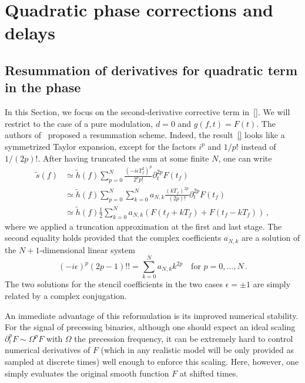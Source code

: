 \documentclass[aps,showpacs,%
prd,superscriptaddress,nofootinbib]{revtex4}
\newcommand{\be}{\begin{equation}}
\newcommand{\ee}{\end{equation}}
\newcommand{\nn}{\nonumber}
\newcommand{\tf}{t_{f}}
\newcommand{\Tf}{T_{f}}
\begin{document}

\section{Quadratic phase corrections and delays}
\label{sec:quadphasedelay}


\subsection{Resummation of derivatives for quadratic term in the phase}
\label{subsec:resumquadphase}

In this Section, we focus on the second-derivative corrective term in~\eqref{}. We will restrict to the case of a pure modulation, $d=0$ and $g(f,t) = F(t)$. The authors of~\cite{Klein+14} proposed a resummation scheme. Indeed, the result~\eqref{} looks like a symmetrized Taylor expansion, except for the factors $i^{p}$ and $1/p!$ instead of $1/(2p)!$. After having truncated the sum at some finite $N$, one can write
%
\begin{align}\label{eq:resumquadphase}
	\tilde{s}(f) &\simeq \tilde{h}(f) \sum\limits_{p = 0}^{N} \frac{(-i\epsilon\Tf^{2})^{p}}{2^{p}p!} \partial_{t}^{2p}F(\tf) \nn\\
	&\simeq \tilde{h}(f) \sum\limits_{p= 0}^{N} \sum\limits_{k=0}^{N} a_{N,k}\frac{(k\Tf)^{2p}}{(2p)!}  \partial_{t}^{2p}F(\tf) \nn\\
	&\simeq \tilde{h}(f) \frac{1}{2}\sum\limits_{k=0}^{N} a_{N,k} \left( F(\tf + k\Tf) + F(\tf-k\Tf) \right)\,,
\end{align}
%
where we applied a truncation approximation at the first and last stage. The second equality holds provided that the complex coefficients $a_{N,k}$ are a solution of the $N+1$-dimensional linear system
\be\label{eq:stencilsystem}
	(-i\epsilon)^{p} (2p-1)!! = \sum\limits_{k=0}^{N} a_{N,k} k^{2p} \quad \text{for } p=0,\dots,N \,.
\ee
The two solutions for the stencil coefficients in the two cases $\epsilon = \pm 1$ are simply related by a complex conjugation.

An immediate advantage of this reformulation is its improved numerical stability. For the signal of precessing binaries, although one should expect an ideal scaling $\partial_{t}^{p} F \sim \Omega^{p} F$ with $\Omega$ the precession frequency, it can be extremely hard to control numerical derivatives of $F$ (which in any realistic model will be only provided as sampled at discrete times) well enough to enforce this scaling. Here, however, one simply evaluates the original smooth function $F$ at shifted times.
\end{document}
